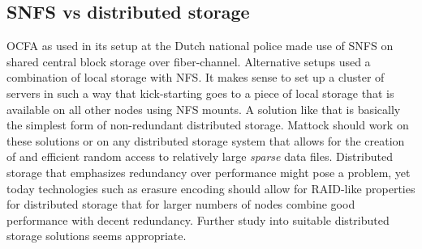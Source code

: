 \subsection{SNFS vs distributed storage}
OCFA as used in its setup at the Dutch national police made use of SNFS on shared central block storage over fiber-channel. Alternative setups used a combination of local storage with NFS. It makes sense to set up a cluster of servers in such a way that kick-starting goes to a piece of local storage that is available on all other nodes using NFS mounts. A solution like that is basically the simplest form of non-redundant distributed storage. Mattock should work on these solutions or on any distributed storage system that allows for the creation of and efficient random access to relatively large \emph{sparse} data files. Distributed storage that emphasizes redundancy over performance might pose a problem, yet today technologies such as erasure encoding should allow for RAID-like properties for distributed storage that for larger numbers of nodes combine good performance with decent redundancy. Further study into suitable distributed storage solutions seems appropriate.
